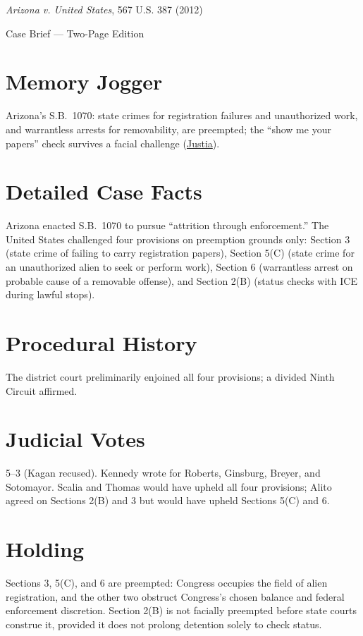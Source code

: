 \documentclass[12pt]{article}
\begin{document}
\begin{center}
{\LARGE \textit{Arizona v. United States}, 567 U.S. 387 (2012)\par}
\vspace{0.5em}
{\large Case Brief --- Two-Page Edition\par}
\end{center}

\section{Memory Jogger}
Arizona's S.B.~1070: state crimes for registration failures and unauthorized work, and warrantless arrests for removability, are preempted; the ``show me your papers'' check survives a facial challenge (\href{https://supreme.justia.com/cases/federal/us/567/387/}{Justia}).

\section{Detailed Case Facts}
Arizona enacted S.B.~1070 to pursue ``attrition through enforcement.'' The United States challenged four provisions on preemption grounds only: Section 3 (state crime of failing to carry registration papers), Section 5(C) (state crime for an unauthorized alien to seek or perform work), Section 6 (warrantless arrest on probable cause of a removable offense), and Section 2(B) (status checks with ICE during lawful stops).

\section{Procedural History}
The district court preliminarily enjoined all four provisions; a divided Ninth Circuit affirmed.

\section{Judicial Votes}
5--3 (Kagan recused). Kennedy wrote for Roberts, Ginsburg, Breyer, and Sotomayor. Scalia and Thomas would have upheld all four provisions; Alito agreed on Sections 2(B) and 3 but would have upheld Sections 5(C) and 6.

\section{Holding}
Sections 3, 5(C), and 6 are preempted: Congress occupies the field of alien registration, and the other two obstruct Congress's chosen balance and federal enforcement discretion. Section 2(B) is not facially preempted before state courts construe it, provided it does not prolong detention solely to check status.
\end{document}
